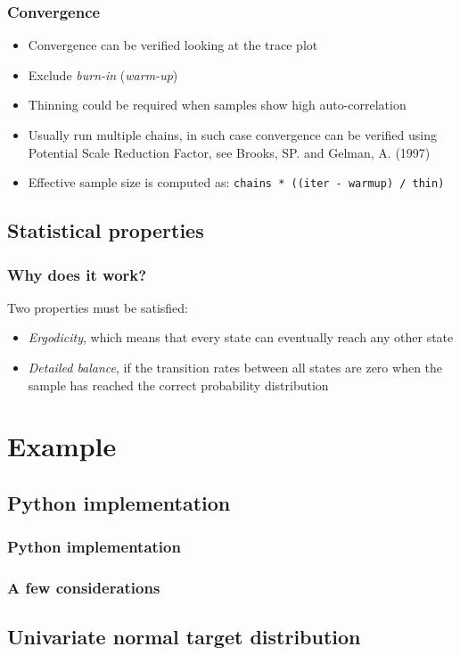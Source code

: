 \documentclass[11pt]{beamer}
\begin{document}
\begin{frame}
	\frametitle{Convergence}
	\begin{itemize}
		\item Convergence can be verified looking at the trace plot
		\item Exclude \textit{burn-in} (\textit{warm-up})
		\item Thinning could be required when samples show high auto-correlation
		\item Usually run multiple chains, in such case convergence can be verified using Potential Scale Reduction Factor, see Brooks, SP. and Gelman, A. (1997)
		\item Effective sample size is computed as: \texttt{chains * ((iter - warmup) / thin)}
	\end{itemize}
\end{frame}


\subsection{Statistical properties}


\begin{frame}
	\frametitle{Why does it work?}
	Two properties must be satisfied:
	\begin{itemize}
		\item \textit{Ergodicity}, which means that every state can eventually reach any other state
		\item \textit{Detailed balance}, if the transition rates between all states are zero when the sample has reached the correct probability distribution
	\end{itemize}
\end{frame}


\section{Example}
\subsection{Python implementation}


\begin{frame}
	\frametitle{Python implementation}
\end{frame}


\begin{frame}
	\frametitle{A few considerations}
\end{frame}


\subsection{Univariate normal target distribution}
\end{document}
